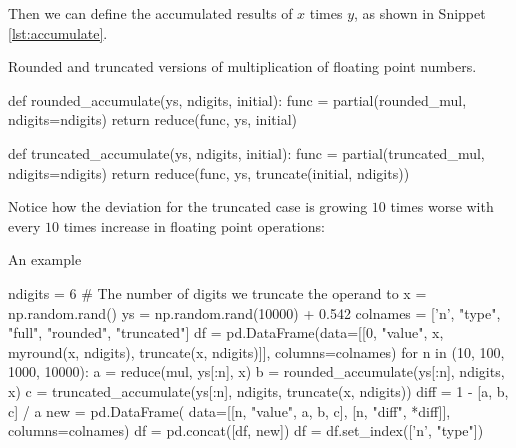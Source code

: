 Then we can define the accumulated results of $x$ times $y$, as shown in Snippet
\ref{lst:accumulate}.

\begin{algorithm}
    \caption{Rounded and truncated versions of multiplication of floating point numbers.}
    \label{lst:accumulate}
    \begin{pythoncode}
        def rounded_accumulate(ys, ndigits, initial):
            func = partial(rounded_mul, ndigits=ndigits)
            return reduce(func, ys, initial)


        def truncated_accumulate(ys, ndigits, initial):
            func = partial(truncated_mul, ndigits=ndigits)
            return reduce(func, ys, truncate(initial, ndigits))
    \end{pythoncode}
\end{algorithm}

Notice how the deviation for the truncated case is growing $10$ times worse with every $10$
times increase in floating point operations:

\begin{algorithm}
    \caption{An example}
    \label{lst:compare}
    \begin{pythoncode}
        ndigits = 6  # The number of digits we truncate the operand to
        x = np.random.rand()
        ys = np.random.rand(10000) + 0.542
        colnames = ['n', "type", "full", "rounded", "truncated"]
        df = pd.DataFrame(data=[[0, "value", x, myround(x, ndigits), truncate(x, ndigits)]],
                          columns=colnames)
        for n in (10, 100, 1000, 10000):
            a = reduce(mul, ys[:n], x)
            b = rounded_accumulate(ys[:n], ndigits, x)
            c = truncated_accumulate(ys[:n], ndigits, truncate(x, ndigits))
            diff = 1 - [a, b, c] / a
            new = pd.DataFrame(
                data=[[n, "value", a, b, c], [n, "diff", *diff]], columns=colnames)
            df = pd.concat([df, new])
        df = df.set_index(['n', "type"])
    \end{pythoncode}
\end{algorithm}

